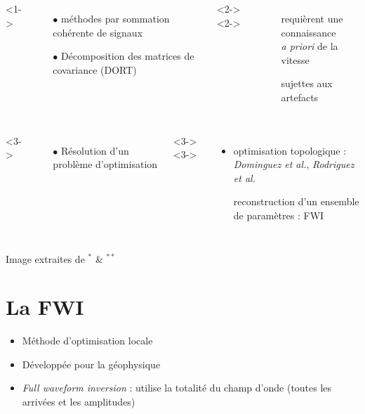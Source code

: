 \documentclass[10pt,xcolor=x11names,compress, notes=show]{beamer}%
\begin{document}
\begin{frame}{\insertsectionhead}
\begin{columns}[c]
	\end{columns}
	\vspace{0.3cm}
	\begin{columns}[c]
			<1->
				\begin{itemize}
					\item[$\bullet$] méthodes par sommation cohérente de signaux
					\item[$\bullet$] Décomposition des matrices de covariance (DORT)
				\end{itemize}
			<2->
			<2->
				\begin{itemize}
					\item[\ding{55}] requièrent une connaissance\\ \emph{a priori} de la vitesse\\
					\item[\ding{55}] sujettes aux artefacts
				\end{itemize}
	\end{columns}
	\begin{columns}[c]
		<3->
			\begin{itemize}
				\item[$\bullet$] Résolution d'un problème d'optimisation
			\end{itemize}
		<3->
		<3->
			\begin{itemize}
			\item optimisation topologique :\\\hspace{-0.5cm}\small{\emph{Dominguez et al.}, \emph{Rodriguez et al.}}\\[0.1cm]
			\item[\ding{51}] \normalsize{reconstruction d'un ensemble de paramètres : FWI}
		\end{itemize}		
	\end{columns}
	\vfill
	{\tiny Image extraites de $^{*}$\cite{chassignole} \& $^{**}$\cite{gardahaut} \vspace{-0.5cm}}
\end{frame} 


\section{La FWI}
\begin{frame}{\insertsectionhead}
	\begin{itemize}
		\item Méthode d'optimisation locale
		\item Développée pour la géophysique
		\item \emph{Full waveform inversion} : utilise la totalité du champ d'onde (toutes les arrivées et les amplitudes)
	\end{itemize}

\end{frame}
\end{document}
